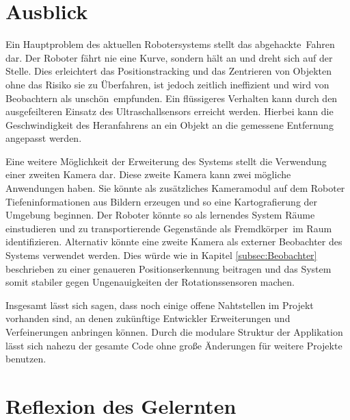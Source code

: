 \section{Ausblick}

Ein Hauptproblem des aktuellen Robotersystems stellt das \glqq abgehackte\grqq\ Fahren dar. Der Roboter fährt nie eine Kurve, sondern hält an und dreht sich auf der Stelle. Dies erleichtert das Positionstracking und das Zentrieren von Objekten ohne das Risiko sie zu Überfahren, ist jedoch zeitlich ineffizient und wird von Beobachtern als \glqq unschön\grqq\ empfunden. Ein flüssigeres Verhalten kann durch den ausgefeilteren Einsatz des Ultraschallsensors erreicht werden. Hierbei kann die Geschwindigkeit des Heranfahrens an ein Objekt an die gemessene Entfernung angepasst werden.

Eine weitere Möglichkeit der Erweiterung des Systems stellt die Verwendung einer zweiten Kamera dar. Diese zweite Kamera kann zwei mögliche Anwendungen haben. Sie könnte als zusätzliches Kameramodul auf dem Roboter Tiefeninformationen aus Bildern erzeugen und so eine Kartografierung der Umgebung beginnen. Der Roboter könnte so als lernendes System Räume einstudieren und zu transportierende Gegenstände als \glqq Fremdkörper\grqq\ im Raum identifizieren. Alternativ könnte eine zweite Kamera als externer Beobachter des Systems verwendet werden. Dies würde wie in Kapitel \ref{subsec:Beobachter} beschrieben zu einer genaueren Positionserkennung beitragen und das System somit stabiler gegen Ungenauigkeiten der Rotationssensoren machen.

Insgesamt lässt sich sagen, dass noch einige offene Nahtstellen im Projekt vorhanden sind, an denen zukünftige Entwickler Erweiterungen und Verfeinerungen anbringen können. Durch die modulare Struktur der Applikation lässt sich nahezu der gesamte Code ohne große Änderungen für weitere Projekte benutzen.

\section{Reflexion des Gelernten}
